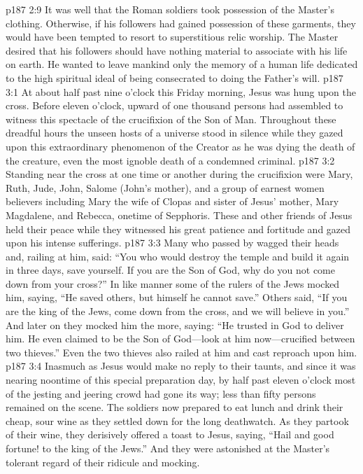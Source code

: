 \pc \vs p187 2:9 It was well that the Roman soldiers took possession of the Master’s clothing. Otherwise, if his followers had gained possession of these garments, they would have been tempted to resort to superstitious relic worship. The Master desired that his followers should have nothing material to associate with his life on earth. He wanted to leave mankind only the memory of a human life dedicated to the high spiritual ideal of being consecrated to doing the Father’s will.
\vs p187 3:1 At about half past nine o’clock this Friday morning, Jesus was hung upon the cross. Before eleven o’clock, upward of one thousand persons had assembled to witness this spectacle of the crucifixion of the Son of Man. Throughout these dreadful hours the unseen hosts of a universe stood in silence while they gazed upon this extraordinary phenomenon of the Creator as he was dying the death of the creature, even the most ignoble death of a condemned criminal.
\vs p187 3:2 Standing near the cross at one time or another during the crucifixion were Mary, Ruth, Jude, John, Salome (John’s mother), and a group of earnest women believers including Mary the wife of Clopas and sister of Jesus’ mother, Mary Magdalene, and Rebecca, onetime of Sepphoris. These and other friends of Jesus held their peace while they witnessed his great patience and fortitude and gazed upon his intense sufferings.
\vs p187 3:3 Many who passed by wagged their heads and, railing at him, said: “You who would destroy the temple and build it again in three days, save yourself. If you are the Son of God, why do you not come down from your cross?” In like manner some of the rulers of the Jews mocked him, saying, “He saved others, but himself he cannot save.” Others said, “If you are the king of the Jews, come down from the cross, and we will believe in you.” And later on they mocked him the more, saying: “He trusted in God to deliver him. He even claimed to be the Son of God---look at him now---crucified between two thieves.” Even the two thieves also railed at him and cast reproach upon him.
\vs p187 3:4 Inasmuch as Jesus would make no reply to their taunts, and since it was nearing noontime of this special preparation day, by half past eleven o’clock most of the jesting and jeering crowd had gone its way; less than fifty persons remained on the scene. The soldiers now prepared to eat lunch and drink their cheap, sour wine as they settled down for the long deathwatch. As they partook of their wine, they derisively offered a toast to Jesus, saying, “Hail and good fortune! to the king of the Jews.” And they were astonished at the Master’s tolerant regard of their ridicule and mocking.

